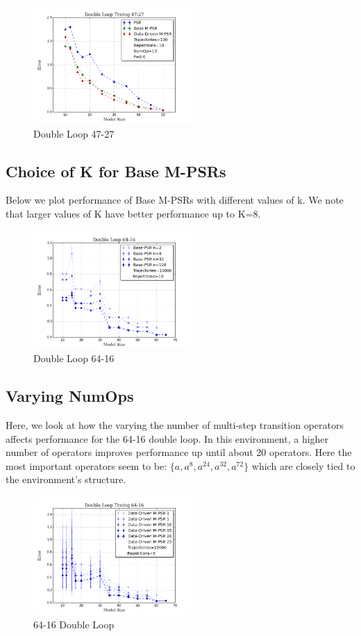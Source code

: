 \begin{figure}[ht!]
\centering
\includegraphics[width=60mm]{uCOREPICS/DL/47-27-10000.png}
\caption{Double Loop 47-27\label{overflow}}
\end{figure}

\subsection{Choice of K for Base M-PSRs}

Below we plot performance of Base M-PSRs with different values of k. We note that larger values of K have better performance up to K=8.

\begin{figure}[ht!]
\centering
\includegraphics[width=60mm]{uCOREPICS/DL/basePows.png}
\caption{Double Loop 64-16\label{overflow}}
\end{figure}

\subsection{Varying NumOps}

Here, we look at how the varying the number of multi-step transition operators affects performance for the 64-16 double loop. In this environment, a higher number of operators improves performance up until about 20 operators. Here the most important operators seem to be: $\{a,a^{8},a^{24},a^{32},a^{72}\}$ which are closely tied to the environment's structure.

\begin{figure}[ht!]
\centering
\includegraphics[width=60mm]{uCOREPICS/DL/numOpsTiming.png}
\caption{64-16 Double Loop\label{overflow}}
\end{figure} 

